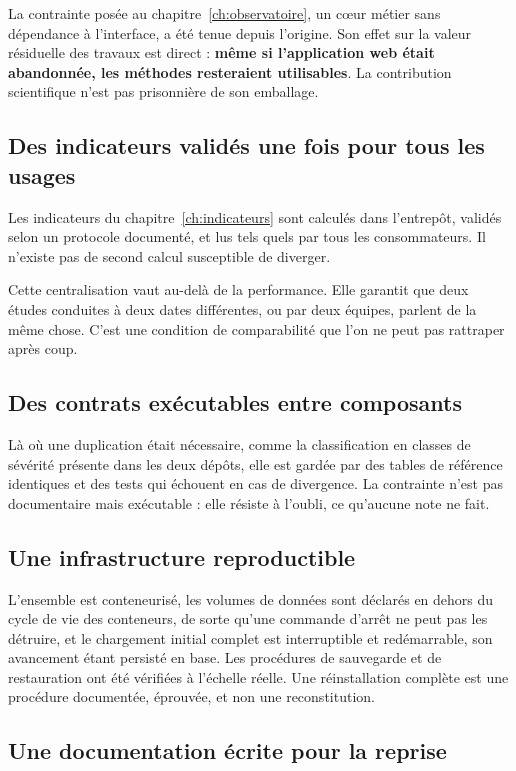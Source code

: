 La contrainte posée au chapitre~\ref{ch:observatoire}, un cœur métier sans dépendance à
l'interface, a été tenue depuis l'origine. Son effet sur la valeur résiduelle des travaux est
direct : \textbf{même si l'application web était abandonnée, les méthodes resteraient
utilisables}. La contribution scientifique n'est pas prisonnière de son emballage.

\subsection{Des indicateurs validés une fois pour tous les usages}

Les indicateurs du chapitre~\ref{ch:indicateurs} sont calculés dans l'entrepôt, validés selon un
protocole documenté, et lus tels quels par tous les consommateurs. Il n'existe pas de second
calcul susceptible de diverger.

Cette centralisation vaut au-delà de la performance. Elle garantit que deux études conduites à
deux dates différentes, ou par deux équipes, parlent de la même chose. C'est une condition de
comparabilité que l'on ne peut pas rattraper après coup.

\subsection{Des contrats exécutables entre composants}

Là où une duplication était nécessaire, comme la classification en classes de sévérité présente
dans les deux dépôts, elle est gardée par des tables de référence identiques et des tests qui
échouent en cas de divergence. La contrainte n'est pas documentaire mais exécutable : elle
résiste à l'oubli, ce qu'aucune note ne fait.

\subsection{Une infrastructure reproductible}

L'ensemble est conteneurisé, les volumes de données sont déclarés en dehors du cycle de vie des
conteneurs, de sorte qu'une commande d'arrêt ne peut pas les détruire, et le chargement initial
complet
est interruptible et redémarrable, son avancement étant persisté en base. Les procédures de
sauvegarde et de restauration ont été vérifiées à l'échelle réelle. Une réinstallation complète
est une procédure documentée, éprouvée, et non une reconstitution.

\subsection{Une documentation écrite pour la reprise}

